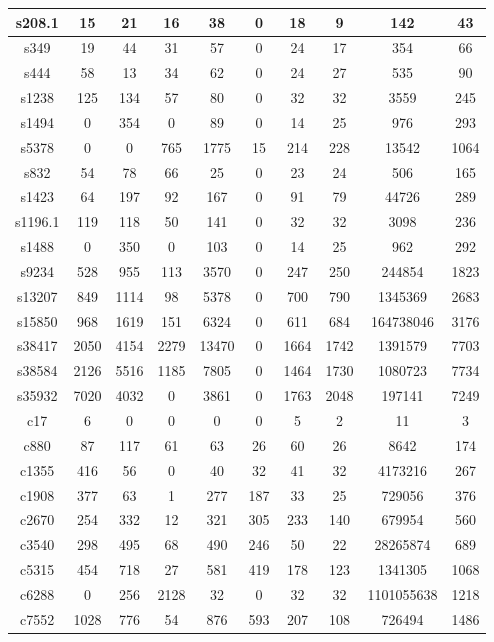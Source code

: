 \documentclass[a4paper,11pt]{article}
\begin{document}
\begin{center}
\begin{tabular}{||c c c c c c c c c c||}
 s208.1 & 15 & 21 & 16 & 38 & 0 & 18 & 9 & 142 & 43 \\ 
\hline
 s349 & 19 & 44 & 31 & 57 & 0 & 24 & 17 & 354 & 66 \\ 
\hline
 s444 & 58 & 13 & 34 & 62 & 0 & 24 & 27 & 535 & 90 \\ 
\hline
 s1238 & 125 & 134 & 57 & 80 & 0 & 32 & 32 & 3559 & 245 \\ 
\hline
 s1494 & 0 & 354 & 0 & 89 & 0 & 14 & 25 & 976 & 293 \\ 
\hline
 s5378 & 0 & 0 & 765 & 1775 & 15 & 214 & 228 & 13542 & 1064 \\ 
\hline
 s832 & 54 & 78 & 66 & 25 & 0 & 23 & 24 & 506 & 165 \\ 
\hline
 s1423 & 64 & 197 & 92 & 167 & 0 & 91 & 79 & 44726 & 289 \\ 
\hline
 s1196.1 & 119 & 118 & 50 & 141 & 0 & 32 & 32 & 3098 & 236 \\ 
\hline
 s1488 & 0 & 350 & 0 & 103 & 0 & 14 & 25 & 962 & 292 \\ 
\hline
 s9234 & 528 & 955 & 113 & 3570 & 0 & 247 & 250 & 244854 & 1823 \\ 
\hline
 s13207 & 849 & 1114 & 98 & 5378 & 0 & 700 & 790 & 1345369 & 2683 \\ 
\hline
 s15850 & 968 & 1619 & 151 & 6324 & 0 & 611 & 684 & 164738046 & 3176 \\ 
\hline
 s38417 & 2050 & 4154 & 2279 & 13470 & 0 & 1664 & 1742 & 1391579 & 7703 \\ 
\hline
 s38584 & 2126 & 5516 & 1185 & 7805 & 0 & 1464 & 1730 & 1080723 & 7734 \\ 
\hline
 s35932 & 7020 & 4032 & 0 & 3861 & 0 & 1763 & 2048 & 197141 & 7249 \\ 
\hline
 c17 & 6 & 0 & 0 & 0 & 0 & 5 & 2 & 11 & 3 \\ 
\hline
 c880 & 87 & 117 & 61 & 63 & 26 & 60 & 26 & 8642 & 174 \\ 
\hline
 c1355 & 416 & 56 & 0 & 40 & 32 & 41 & 32 & 4173216 & 267 \\ 
\hline
 c1908 & 377 & 63 & 1 & 277 & 187 & 33 & 25 & 729056 & 376 \\ 
\hline
 c2670 & 254 & 332 & 12 & 321 & 305 & 233 & 140 & 679954 & 560 \\ 
\hline
 c3540 & 298 & 495 & 68 & 490 & 246 & 50 & 22 & 28265874 & 689 \\ 
\hline
 c5315 & 454 & 718 & 27 & 581 & 419 & 178 & 123 & 1341305 & 1068 \\ 
\hline
 c6288 & 0 & 256 & 2128 & 32 & 0 & 32 & 32 & 1101055638 & 1218 \\ 
\hline
 c7552 & 1028 & 776 & 54 & 876 & 593 & 207 & 108 & 726494 & 1486 \\ 
\hline
\end{tabular}
\end{center}
\end{document}
